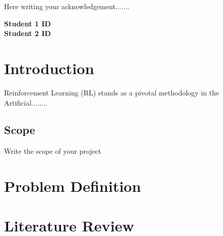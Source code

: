 \documentclass[ 12pt,a4paper,twocolumn,fleqn]{article}
\begin{document}
Here writing your acknowledgement.......
\begin{flushright}
\begin{centering}
    \textbf{Student 1 \space ID} \\
\textbf{Student 2 \space ID} \\

\end{centering}

\end{flushright}


\newpage
  \pagestyle{fancy}
\thisfancypage{%
  \setlength{\fboxsep}{20pt}\doublebox}{}
  
\modulolinenumbers[5]
\onecolumn
\newpage
  \pagestyle{fancy}
\thisfancypage{%
  \setlength{\fboxsep}{20pt}\doublebox}{}
\tableofcontents
\newpage
  \pagestyle{fancy}
\thisfancypage{%
  \setlength{\fboxsep}{20pt}\doublebox}{}
\newpage
  \pagestyle{fancy}
\thisfancypage{%
  \setlength{\fboxsep}{20pt}\doublebox}{}
  
\section{Introduction}
Reinforcement Learning (RL) \cite{b1} stands as a pivotal methodology in the Artificial........

\subsection{Scope}
Write the scope of your project

\section{Problem Definition}


\section{Literature Review}
\end{document}
